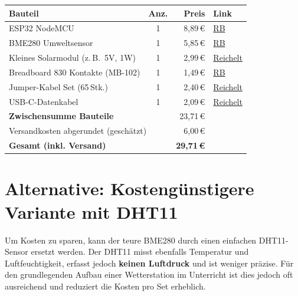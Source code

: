 \documentclass[a4paper,12pt]{article}
\begin{document}
\begin{table}[h!]
\centering
\renewcommand{\arraystretch}{1.35}
\begin{tabular}{@{} l c r l @{}}
\toprule
\textbf{Bauteil} & \textbf{Anz.} & \textbf{Preis} & \textbf{Link} \\
\midrule

ESP32 NodeMCU 
  & 1 & 8,89\,\euro{}
  & \href{https://www.roboter-bausatz.de/p/nodemcu-esp32-usb-c-38-pin}{RB} \\

BME280 Umweltsensor 
  & 1 & 5,85\,\euro{}
  & \href{https://www.roboter-bausatz.de/p/digital-bme280-temperatur-sensor-luftdruck-feuchtigkeit-i2c-5v-barometer-arduino?number=RBS15806}{RB} \\


Kleines Solarmodul (z.\,B.\ 5V, 1W)
  & 1 & 2,99\,\euro{}
  & \href{https://www.reichelt.de/de/de/shop/produkt/entwicklerboards_-_solarpanel_0_5_w-254385}{Reichelt} \\

Breadboard 830 Kontakte (MB-102)
  & 1 & 1,49\,\euro{}
  & \href{https://www.roboter-bausatz.de/p/mb102-breadboard-830-kontakte}{RB} \\

Jumper-Kabel Set (65\,Stk.)
  & 1 & 2,40\,\euro{}
  & \href{https://www.reichelt.de/de/de/shop/produkt/entwicklerboards_-_kabel-set_verschiedene_laengen_65er-pack_-282690}{Reichelt} \\
  
USB-C-Datenkabel
  & 1 & 2,09\,\euro{}
  & \href{https://www.reichelt.de/de/de/shop/produkt/sync-_ladekabel_usb-a_-_usb-c_0_5_m_schwarz-215846}{Reichelt} \\

\midrule
\multicolumn{2}{l}{\textbf{Zwischensumme Bauteile}}
  & 23,71\,\euro{} & \\
\multicolumn{2}{l}{Versandkosten abgerundet (geschätzt)}
  & 6,00\,\euro{} & \\
\midrule
\multicolumn{2}{l}{\textbf{Gesamt (inkl. Versand)}}
  & \textbf{29,71\,\euro{}} & \\
\bottomrule
\end{tabular}
\label{tab:kosten-bme280}
\end{table}

\newpage
\section{Alternative: Kostengünstigere Variante mit DHT11}
Um Kosten zu sparen, kann der teure BME280 durch einen einfachen DHT11-Sensor ersetzt werden. Der DHT11 misst ebenfalls Temperatur und Luftfeuchtigkeit, erfasst jedoch \textbf{keinen Luftdruck} und ist weniger präzise. Für den grundlegenden Aufbau einer Wetterstation im Unterricht ist dies jedoch oft ausreichend und reduziert die Kosten pro Set erheblich.
\end{document}
